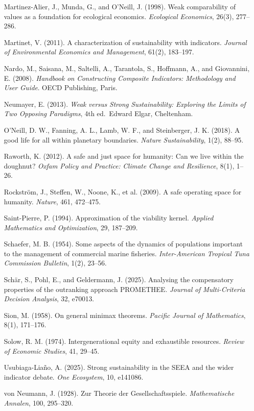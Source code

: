 \documentclass[3p,11pt]{elsarticle}
\begin{document}
Martinez-Alier, J., Munda, G., and O'Neill, J. (1998). Weak
comparability of values as a foundation for ecological economics.
\emph{Ecological Economics}, 26(3), 277--286.

Martinet, V. (2011). A characterization of sustainability with
indicators. \emph{Journal of Environmental Economics and Management},
61(2), 183--197.

Nardo, M., Saisana, M., Saltelli, A., Tarantola, S., Hoffmann, A., and Giovannini, E. (2008). \emph{Handbook on Constructing Composite Indicators: Methodology and User Guide}. OECD Publishing, Paris.

Neumayer, E. (2013). \emph{Weak versus Strong Sustainability: Exploring
the Limits of Two Opposing Paradigms}, 4th ed.~Edward Elgar, Cheltenham.

O'Neill, D. W., Fanning, A. L., Lamb, W. F., and Steinberger, J. K. (2018). A good life for all within planetary boundaries. \emph{Nature Sustainability}, 1(2), 88--95.

Raworth, K. (2012). A safe and just space for humanity: Can we live within the doughnut? \emph{Oxfam Policy and Practice: Climate Change and Resilience}, 8(1), 1--26.

Rockstr\"om, J., Steffen, W., Noone, K., et al. (2009). A safe operating
space for humanity. \emph{Nature}, 461, 472--475.

Saint-Pierre, P. (1994). Approximation of the viability kernel.
\emph{Applied Mathematics and Optimization}, 29, 187--209.

Schaefer, M. B. (1954). Some aspects of the dynamics of populations important to the management of commercial marine fisheries. \emph{Inter-American Tropical Tuna Commission Bulletin}, 1(2), 23--56.

Sch\"ar, S., Pohl, E., and Geldermann, J. (2025). Analysing the
compensatory properties of the outranking approach PROMETHEE.
\emph{Journal of Multi-Criteria Decision Analysis}, 32, e70013.

Sion, M. (1958). On general minimax theorems. \emph{Pacific Journal of
Mathematics}, 8(1), 171--176.

Solow, R. M. (1974). Intergenerational equity and exhaustible resources.
\emph{Review of Economic Studies}, 41, 29--45.

Usubiaga-Lia\~no, A. (2025). Strong sustainability in the SEEA and the
wider indicator debate. \emph{One Ecosystem}, 10, e141086.

von Neumann, J. (1928). Zur Theorie der Gesellschaftsspiele.
\emph{Mathematische Annalen}, 100, 295--320.
\end{document}
